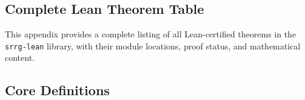 \documentclass[11pt]{article}
\theoremstyle{remark}
\newcommand{\lean}[1]{%
  \penalty-100
  \begingroup
  \def\_{\textunderscore\allowbreak}%
  \texttt{#1}%
  \endgroup
}
\begin{document}
\begin{appendices}
\section{Complete Lean Theorem Table}
\label{app:theorems}

This appendix provides a complete listing of all Lean-certified theorems in the
\lean{srrg-lean} library, with their module locations, proof status,
and mathematical content.

\subsection{Core Definitions}


\end{appendices}
\end{document}
